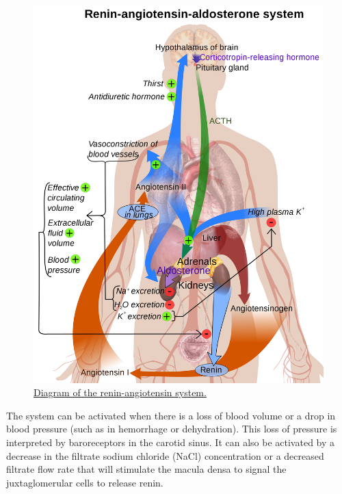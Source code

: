 \begin{figure}

{\centering \includegraphics[width=0.7\linewidth]{./figures/endocrine/Renin-angiotensin_system_in_man_shadow} 

}

\caption{\href{https://commons.wikimedia.org/wiki/File:Renin-angiotensin_system_in_man_shadow.svg}{Diagram of the renin-angiotensin system.}}\label{fig:reninangiotensin}
\end{figure}

The system can be activated when there is a loss of blood volume or a drop in blood pressure (such as in hemorrhage or dehydration). This loss of pressure is interpreted by baroreceptors in the carotid sinus. It can also be activated by a decrease in the filtrate sodium chloride (NaCl) concentration or a decreased filtrate flow rate that will stimulate the macula densa to signal the juxtaglomerular cells to release renin.

